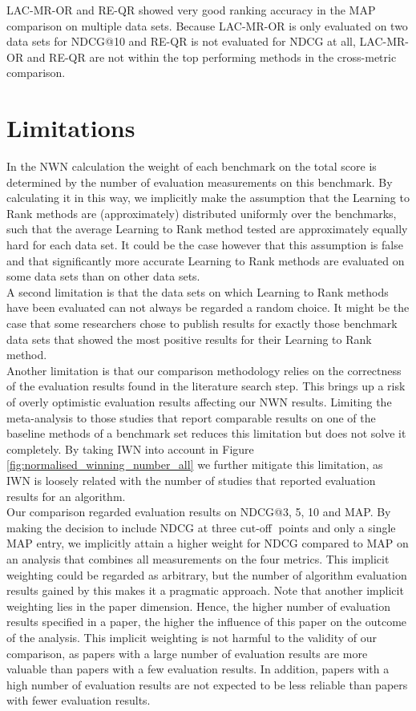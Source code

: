 LAC-MR-OR and RE-QR showed very good ranking accuracy in the \ac{MAP} comparison on multiple data sets. Because LAC-MR-OR is only evaluated on two data sets for \ac{NDCG}@10 and RE-QR is not evaluated for \ac{NDCG} at all, LAC-MR-OR and RE-QR are not within the top performing methods in the cross-metric comparison. 

\section{Limitations}
In the \ac{NWN} calculation the weight of each benchmark on the total score is determined by the number of evaluation measurements on this benchmark. By calculating it in this way, we implicitly make the assumption that the Learning to Rank methods are (approximately) distributed uniformly over the benchmarks, such that the average Learning to Rank method tested are approximately equally hard for each data set. It could be the case however that this assumption is false and that significantly more accurate Learning to Rank methods are evaluated on some data sets than on other data sets. \\

A second limitation is that the data sets on which Learning to Rank methods have been evaluated can not always be regarded a random choice. It might be the case that some researchers chose to publish results for exactly those benchmark data sets that showed the most positive results for their Learning to Rank method.\\

Another limitation is that our comparison methodology relies on the correctness of the evaluation results found in the literature search step. This brings up a risk of overly optimistic evaluation results affecting our NWN results. Limiting the meta-analysis to those studies that report comparable results on one of the baseline methods of a benchmark set reduces this limitation but does not solve it completely. By taking IWN into account in Figure \ref{fig:normalised_winning_number_all} we further mitigate this limitation, as IWN is loosely related with the number of studies that reported evaluation results for an algorithm.\\

Our comparison regarded evaluation results on \ac{NDCG}@{3, 5, 10} and \ac{MAP}. By making the decision to include \ac{NDCG} at three cut-off points and only a single \ac{MAP} entry, we implicitly attain a higher weight for \ac{NDCG} compared to \ac{MAP} on an analysis that combines all measurements on the four metrics. This implicit weighting could be regarded as arbitrary, but the number of algorithm evaluation results gained by this makes it a pragmatic approach. Note that another implicit weighting lies in the paper dimension. Hence, the higher number of evaluation results specified in a paper, the higher the influence of this paper on the outcome of the analysis. This implicit weighting is not harmful to the validity of our comparison, as papers with a large number of evaluation results are more valuable than papers with a few evaluation results. In addition, papers with a high number of evaluation results are not expected to be less reliable than papers with fewer evaluation results.

